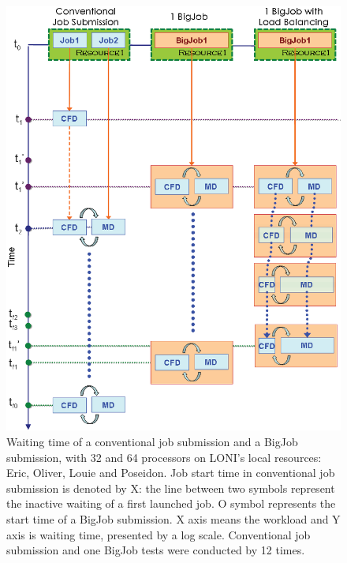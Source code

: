 \documentclass[conference,final]{IEEEtran}
\begin{document}
\begin{figure}
\centering
\includegraphics[scale=0.40]{Simulation_Time_of_One_BigJob.eps}
\caption{\small Waiting time of a conventional job submission and a BigJob submission, with 32 and 64 processors on LONI's local resources: Eric, Oliver, Louie and Poseidon. Job start time in conventional job submission is denoted by X: the line between two symbols represent the inactive waiting of a first launched job. O symbol represents the start time of a BigJob submission. X axis means the workload and Y axis is waiting time, presented by a log scale. Conventional job submission and one BigJob tests were conducted by 12 times.}
\label{Fig:Queuewait_LONI}
\end{figure}
\end{document}
